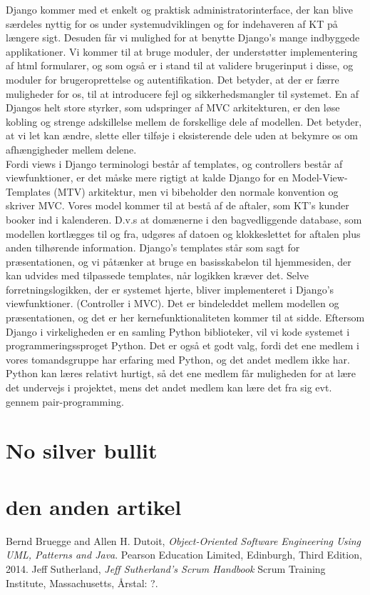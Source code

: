 \documentclass[12pt]{article}   %
\begin{document}
Django kommer med et enkelt og praktisk administratorinterface, der kan blive
særdeles nyttig for os under systemudviklingen og for indehaveren af KT på
længere sigt. Desuden får vi mulighed for at benytte Django's mange indbyggede 
applikationer. Vi kommer til at bruge moduler, der understøtter implementering af
html formularer, og som også er i stand til at validere brugerinput i disse,
og moduler for brugeroprettelse og autentifikation. Det betyder, at der er
færre muligheder for os, til at introducere fejl og sikkerhedsmangler til
systemet. En af Djangos helt store styrker, som udspringer af MVC arkitekturen,
er den løse kobling og strenge adskillelse mellem de forskellige dele af modellen.
Det betyder, at vi let kan ændre, slette eller tilføje i eksisterende dele uden at
bekymre os om afhængigheder mellem delene. \\
Fordi views i Django terminologi består af templates, og controllers består af
viewfunktioner, er det måske mere rigtigt at kalde Django for en Model-View-Templates
(MTV) arkitektur, men vi bibeholder den normale konvention og skriver MVC. Vores
model kommer til at bestå af de aftaler, som KT's kunder booker ind i kalenderen.
D.v.s at domænerne i den bagvedliggende database, som modellen kortlægges til og 
fra, udgøres af datoen og klokkeslettet for aftalen plus anden tilhørende
information. Django's templates står som sagt for præsentationen, og vi
påtænker at bruge en basisskabelon til hjemmesiden, der kan udvides med
tilpassede templates, når logikken kræver det. Selve forretningslogikken, der
er systemet hjerte, bliver implementeret i Django's viewfunktioner.
(Controller i MVC). Det er bindeleddet mellem modellen og præsentationen, og
det er her kernefunktionaliteten kommer til at sidde. Eftersom Django i
virkeligheden er en samling Python biblioteker, vil vi kode systemet i
programmeringssproget Python. Det er også et godt valg, fordi det ene medlem i
vores tomandsgruppe har erfaring med Python, og det andet medlem ikke har.
Python kan læres relativt hurtigt, så det ene medlem får muligheden for at
lære det undervejs i projektet, mens det andet medlem kan lære det fra sig
evt. gennem pair-programming. \\ 



\section{No silver bullit}
\section{ den anden artikel}


\begin{thebibliography}{9}
		Bernd Bruegge and Allen H. Dutoit,
		\emph{Object-Oriented Software Engineering Using UML, Patterns
		and Java}.
		Pearson Education Limited, Edinburgh,
		Third Edition,
		2014.
		Jeff Sutherland,
		\emph{Jeff Sutherland's Scrum Handbook}
		Scrum Training Institute, Massachusetts,
		Årstal: ?.
\end{thebibliography}
\end{document}
